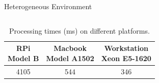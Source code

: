 \begin{frame}{Heterogeneous Environment}
{\begin{columns}
      \begin{table}
        \footnotesize
        \centering
        \begin{tabular}{c c c}
          \toprule
          \specialcell{RPi\\Model B}
          & \specialcell{Macbook \\ Model A1502}
          & \specialcell{Workstation\\Xeon E5-1620} \\
          \midrule
          4105 & 544 & 346 \\
          \bottomrule
        \end{tabular}
        \caption{Processing times (ms) on different platforms.}
      \end{table}
    \end{columns}
  }
\end{frame}

